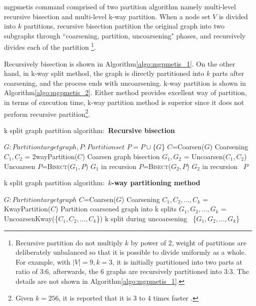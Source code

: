 mgpmetis command comprised of two partition algorithm namely multi-level recursive bisection and multi-level k-way partition. 
When a node set  $V$ is divided into $k$ partitions, recursive bisection partition the original graph into two subgraphs through ``coarsening, partition, uncoarsening" phases, and recursively divides each of the partition
\footnote{
Recursive partition do not multiply $k$ by power of 2, weight of partitions are deliberately unbalanced so that it is possible to divide uniformly as a whole. For example, with $|V|=9, k=3$, it is initially partitioned into two parts at ratio of 3:6, afterwards, the 6 graphs are recursively partitioned into 3:3. The details are not shown in Algorithm\ref{algo:mgpmetis_1}. 
}.  

Recursively bisection is shown in Algorithm\ref{algo:mgpmetis_1}. 
 On the other hand, in k-way split method, the graph is directly partitioned into  $k$ parts after coarsening, and the process ends with uncoarsening. k-way partition is shown in  Algorithm\ref{algo:mgpmetis_2}. 
Either method provides excellent way of partition, in terms of execution time, k-way partition method is superior since it does not perform recursive partition\footnote{
Given $k=256$, it is reported that it is 3 to 4 times faster \cite{Karypis1998}.}.  
 

\begin{algorithm}
\caption{k split graph partition algorithm:\ \textbf{Recursive bisection}\label{algo:mgpmetis_1}}
\begin{small}
\begin{algorithmic}[1]
	\State $G:Partition target graph, P: Partition set$
		\State $P=P\cup \{G$\} 
	\Else
		\State $C$=Coarsen($G$) \Comment Coarsening
		\State $C_1,C_2$ = 2wayPartition($C$) \Comment Coarsen graph bisection 
		\State $G_1,G_2$ = Uncoarsen($C_1,C_2$) \Comment Uncoarsen
		\State $P$=\textsc{Bisect}($G_1,P$) \Comment $G_1$ in recursion 
		\State $P$=\textsc{Bisect}($G_2,P$) \Comment $G_2$ in recursion 
	\EndIf
	\ $P$
\EndFunction
\end{algorithmic}
\end{small}
\end{algorithm}

\begin{algorithm}
\caption{k split graph partition algorithm:\ \textbf{$k$-way partitioning method}\label{algo:mgpmetis_2}}
\begin{small}
\begin{algorithmic}[1]
	\State $G: Partition target graph$
	\State $C$=Coarsen($G$) \Comment Coarsening
	\State $C_1,C_2,\dots,C_k$ = KwayPartition($C$) \Comment Partition coarsened graph into k splits
	\State $G_1,G_2,\dots,G_k$ = UncoarsenKway(\{$C_1,C_2,\dots,C_k$\}) \Comment k split during uncoarsening
	\ \{$G_1,G_2,\dots,G_k$\}
\EndFunction
\end{algorithmic}
\end{small}
\end{algorithm}

